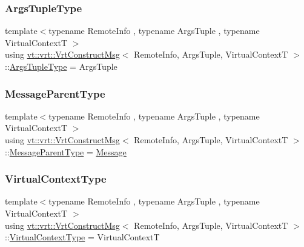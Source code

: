\subsubsection{\texorpdfstring{Args\+Tuple\+Type}{ArgsTupleType}}
{\footnotesize\ttfamily template$<$typename Remote\+Info , typename Args\+Tuple , typename Virtual\+ContextT $>$ \\
using \hyperlink{structvt_1_1vrt_1_1_vrt_construct_msg}{vt\+::vrt\+::\+Vrt\+Construct\+Msg}$<$ Remote\+Info, Args\+Tuple, Virtual\+ContextT $>$\+::\hyperlink{structvt_1_1vrt_1_1_vrt_construct_msg_a5ec9caa553a3004bce6a6ee151d15900}{Args\+Tuple\+Type} =  Args\+Tuple}

\mbox{\label{structvt_1_1vrt_1_1_vrt_construct_msg_a221d426f1d0e6b42618fb587d903ff0e}} 
\subsubsection{\texorpdfstring{Message\+Parent\+Type}{MessageParentType}}
{\footnotesize\ttfamily template$<$typename Remote\+Info , typename Args\+Tuple , typename Virtual\+ContextT $>$ \\
using \hyperlink{structvt_1_1vrt_1_1_vrt_construct_msg}{vt\+::vrt\+::\+Vrt\+Construct\+Msg}$<$ Remote\+Info, Args\+Tuple, Virtual\+ContextT $>$\+::\hyperlink{structvt_1_1messaging_1_1_active_msg_ac2e6d93267991027ce78c968b17064c7}{Message\+Parent\+Type} =  \hyperlink{namespacevt_a3a3ddfef40b4c90915fa43cdd5f129ea}{Message}}

\mbox{\label{structvt_1_1vrt_1_1_vrt_construct_msg_aa5ff9ea61a1fcefeb0272fa0f5b6adc9}} 
\subsubsection{\texorpdfstring{Virtual\+Context\+Type}{VirtualContextType}}
{\footnotesize\ttfamily template$<$typename Remote\+Info , typename Args\+Tuple , typename Virtual\+ContextT $>$ \\
using \hyperlink{structvt_1_1vrt_1_1_vrt_construct_msg}{vt\+::vrt\+::\+Vrt\+Construct\+Msg}$<$ Remote\+Info, Args\+Tuple, Virtual\+ContextT $>$\+::\hyperlink{structvt_1_1vrt_1_1_vrt_construct_msg_aa5ff9ea61a1fcefeb0272fa0f5b6adc9}{Virtual\+Context\+Type} =  Virtual\+ContextT}



